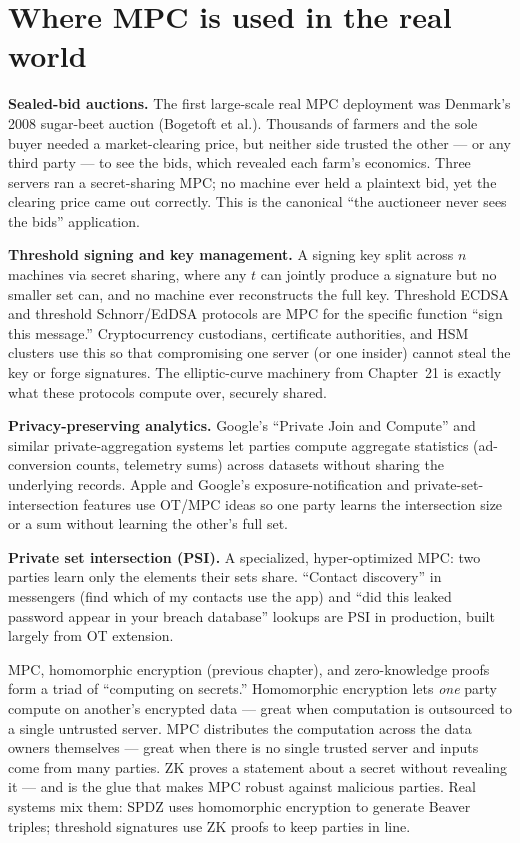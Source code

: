 \section{Where MPC is used in the real world}
\label{ch34:applications}

\begin{applicationbox}
\textbf{Sealed-bid auctions.} The first large-scale real MPC deployment was Denmark's 2008 sugar-beet auction (Bogetoft et al.). Thousands of farmers and the sole buyer needed a market-clearing price, but neither side trusted the other --- or any third party --- to see the bids, which revealed each farm's economics. Three servers ran a secret-sharing MPC; no machine ever held a plaintext bid, yet the clearing price came out correctly. This is the canonical ``the auctioneer never sees the bids'' application.

\textbf{Threshold signing and key management.} A signing key split across $n$ machines via secret sharing, where any $t$ can jointly produce a signature but no smaller set can, and no machine ever reconstructs the full key. Threshold ECDSA and threshold Schnorr/EdDSA protocols are MPC for the specific function ``sign this message.'' Cryptocurrency custodians, certificate authorities, and HSM clusters use this so that compromising one server (or one insider) cannot steal the key or forge signatures. The elliptic-curve machinery from Chapter~21 is exactly what these protocols compute over, securely shared.

\textbf{Privacy-preserving analytics.} Google's ``Private Join and Compute'' and similar private-aggregation systems let parties compute aggregate statistics (ad-conversion counts, telemetry sums) across datasets without sharing the underlying records. Apple and Google's exposure-notification and private-set-intersection features use OT/MPC ideas so one party learns the intersection size or a sum without learning the other's full set.

\textbf{Private set intersection (PSI).} A specialized, hyper-optimized MPC: two parties learn only the elements their sets share. ``Contact discovery'' in messengers (find which of my contacts use the app) and ``did this leaked password appear in your breach database'' lookups are PSI in production, built largely from OT extension.
\end{applicationbox}

\begin{connectionbox}
MPC, homomorphic encryption (previous chapter), and zero-knowledge proofs form a triad of ``computing on secrets.'' Homomorphic encryption lets \emph{one} party compute on another's encrypted data --- great when computation is outsourced to a single untrusted server. MPC distributes the computation across the data owners themselves --- great when there is no single trusted server and inputs come from many parties. ZK proves a statement about a secret without revealing it --- and is the glue that makes MPC robust against malicious parties. Real systems mix them: SPDZ uses homomorphic encryption to generate Beaver triples; threshold signatures use ZK proofs to keep parties in line.
\end{connectionbox}

